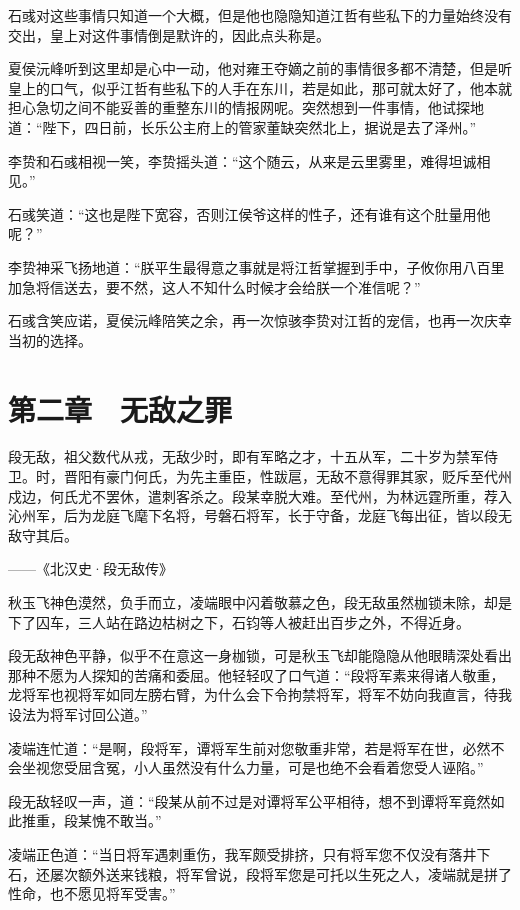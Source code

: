 石彧对这些事情只知道一个大概，但是他也隐隐知道江哲有些私下的力量始终没有交出，皇上对这件事情倒是默许的，因此点头称是。

夏侯沅峰听到这里却是心中一动，他对雍王夺嫡之前的事情很多都不清楚，但是听皇上的口气，似乎江哲有些私下的人手在东川，若是如此，那可就太好了，他本就担心急切之间不能妥善的重整东川的情报网呢。突然想到一件事情，他试探地道：“陛下，四日前，长乐公主府上的管家董缺突然北上，据说是去了泽州。”

李贽和石彧相视一笑，李贽摇头道：“这个随云，从来是云里雾里，难得坦诚相见。”

石彧笑道：“这也是陛下宽容，否则江侯爷这样的性子，还有谁有这个肚量用他呢？”

李贽神采飞扬地道：“朕平生最得意之事就是将江哲掌握到手中，子攸你用八百里加急将信送去，要不然，这人不知什么时候才会给朕一个准信呢？”

石彧含笑应诺，夏侯沅峰陪笑之余，再一次惊骇李贽对江哲的宠信，也再一次庆幸当初的选择。

\chapter{第二章　无敌之罪}

段无敌，祖父数代从戎，无敌少时，即有军略之才，十五从军，二十岁为禁军侍卫。时，晋阳有豪门何氏，为先主重臣，性跋扈，无敌不意得罪其家，贬斥至代州戍边，何氏尤不罢休，遣刺客杀之。段某幸脱大难。至代州，为林远霆所重，荐入沁州军，后为龙庭飞麾下名将，号磐石将军，长于守备，龙庭飞每出征，皆以段无敌守其后。

——《北汉史·段无敌传》

秋玉飞神色漠然，负手而立，凌端眼中闪着敬慕之色，段无敌虽然枷锁未除，却是下了囚车，三人站在路边枯树之下，石钧等人被赶出百步之外，不得近身。

段无敌神色平静，似乎不在意这一身枷锁，可是秋玉飞却能隐隐从他眼睛深处看出那种不愿为人探知的苦痛和委屈。他轻轻叹了口气道：“段将军素来得诸人敬重，龙将军也视将军如同左膀右臂，为什么会下令拘禁将军，将军不妨向我直言，待我设法为将军讨回公道。”

凌端连忙道：“是啊，段将军，谭将军生前对您敬重非常，若是将军在世，必然不会坐视您受屈含冤，小人虽然没有什么力量，可是也绝不会看着您受人诬陷。”

段无敌轻叹一声，道：“段某从前不过是对谭将军公平相待，想不到谭将军竟然如此推重，段某愧不敢当。”

凌端正色道：“当日将军遇刺重伤，我军颇受排挤，只有将军您不仅没有落井下石，还屡次额外送来钱粮，将军曾说，段将军您是可托以生死之人，凌端就是拼了性命，也不愿见将军受害。”

